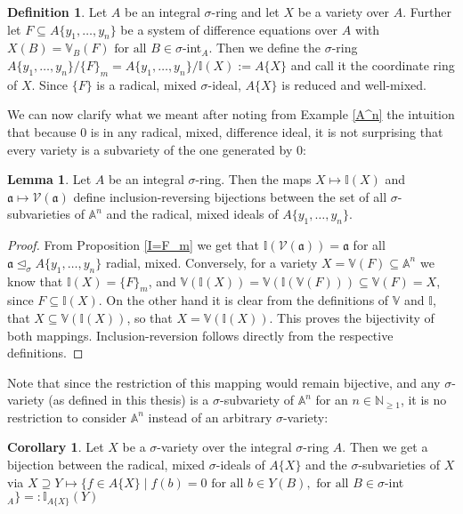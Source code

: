 \documentclass{article}
\def\I{\mathbb{I}}
\def\NE{\mathbb{N}_{\geq1}}
\def\V{\mathcal{V}}
\def\VV{\mathbb{V}}
\def\a{\mathfrak{a}}
\def\s{\sigma}
\def\si{\unlhd_{\sigma}}
\def\fa{\text{ for all }}
\newenvironment{bew}{\begin{proof}[Proof]}{\end{proof}}
\theoremstyle{definition}
\newtheorem{cor}[Satz]{Corollary}
\newtheorem{defn}[Satz]{Definition}
\newtheorem{lem}[Satz]{Lemma}
\begin{document}
\begin{defn}
Let $A$ be an integral $\s$-ring and let $X$ be a variety over $A$. Further let $F \subseteq A\{y_1, \ldots, y_n\}$ be a system of difference equations over $A$ with $X(B) = \VV_B(F) \fa B \in \s$-int$_A$.
Then we define the $\s$-ring $A\{y_1, \ldots, y_n\}/\{F\}_m = A\{y_1, \ldots, y_n\}/\I(X) := A\{X\}$ and call it the coordinate ring of $X$. Since $\{F\}$ is a radical, mixed $\s$-ideal, $A\{X\}$ is reduced and well-mixed.
\end{defn}


We can now clarify what we meant after noting from Example \ref{A^n} the intuition that because $0$ is in any radical, mixed, difference ideal, it is not surprising that every variety is a subvariety of the one generated by $0$:

 \begin{lem}
Let $A$ be an integral $\s$-ring. Then the maps $X \mapsto \I(X)$ and $\a \mapsto \V(\a)$ define inclusion-reversing bijections between the set of all $\s$-subvarieties of $\mathbb{A}^n$ and the radical, mixed ideals of $A\{y_1,\ldots,y_n\}$.
\begin{bew}
From Proposition \ref{I=F_m} we get that $\I(\V(\a)) = \a$ for all $\a \si A\{y_1,\ldots,y_n\}$ radial, mixed. Conversely, for a variety $X = \VV(F) \subseteq \mathbb{A}^n$ we know that $\I(X) = \{F\}_m$, and $\VV(\I(X)) = \VV(\I(\VV(F))) \subseteq \VV(F) = X$,
 since $F \subseteq \I(X)$. On the other hand it is clear from the definitions of $\VV$ and $ \I$, that $X \subseteq \VV(\I(X))$, so that $X = \VV(\I(X))$. This proves the bijectivity of both mappings. Inclusion-reversion follows directly from the respective definitions.
\end{bew}
\end{lem}

Note that since the restriction of this mapping would remain bijective, and any $\s$-variety (as defined in this thesis) is a $\s$-subvariety of $\mathbb{A}^n$ for an $n \in \NE$, it is no restriction to consider $\mathbb{A}^n$ instead of an arbitrary $\s$-variety:
\begin{cor}
  Let $X$ be a $\s$-variety over the integral $\s$-ring $A$. Then we get a bijection between the radical, mixed $\s$-ideals of $A\{X\}$ and the $\s$-subvarieties of $X$ via $X \supseteq Y \mapsto \{f \in A\{X\} \mid f(b) = 0 \fa b \in Y(B), \fa B \in \s$-int$_A \} =: \I_{A\{X\}}(Y)$
\end{cor}
\end{document}
